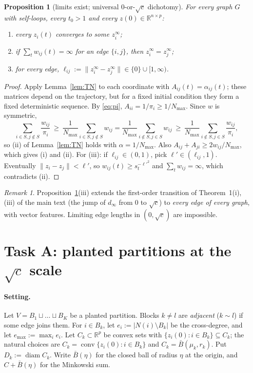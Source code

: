 \documentclass[11pt]{article}
\newtheorem{proposition}[theorem]{Proposition}
\theoremstyle{definition}
\theoremstyle{remark}
\newtheorem{remark}[theorem]{Remark}
\newcommand{\R}{\mathbb{R}}
\newcommand{\diam}{\operatorname{diam}}
\newcommand{\conv}{\operatorname{conv}}
\newcommand{\Nmax}{N_{\max}}
\begin{document}
\begin{proposition}[limits exist; universal $0$-or-$\sqrt c$ dichotomy]\label{prop:dichotomy}
For every graph $G$ with self-loops, every $t_0>1$ and every $z(0)\in\R^{n\times p}$:
\begin{enumerate}[label=(\roman*)]
\item every $z_i(t)$ converges to some $z_i^\infty$;
\item if $\sum_tw_{ij}(t)=\infty$ for an edge $\{i,j\}$, then $z_i^\infty=z_j^\infty$;
\item for every edge, $\ell_{ij}:=\|z_i^\infty-z_j^\infty\|\in\{0\}\cup[1,\infty)$.
\end{enumerate}
\end{proposition}
\begin{proof}
Apply Lemma~\ref{lem:TN} to each coordinate with $A_{ij}(t)=\alpha_{ij}(t)$; these matrices depend on the
trajectory, but for a fixed initial condition they form a fixed deterministic sequence.
By \eqref{eq:pi}, $A_{ii}=1/\pi_i\ge1/\Nmax$. Since $w$ is symmetric,
\[
\sum_{i\in S,j\notin S}\frac{w_{ij}}{\pi_i}\ \ge\ \frac1{\Nmax}\sum_{i\in S,j\notin S}w_{ij}
=\frac1{\Nmax}\sum_{i\notin S,j\in S}w_{ij}\ \ge\ \frac1{\Nmax}\sum_{i\notin S,j\in S}\frac{w_{ij}}{\pi_i},
\]
so (ii) of Lemma~\ref{lem:TN} holds with $\alpha=1/\Nmax$. Also $A_{ij}+A_{ji}\ge 2w_{ij}/\Nmax$, which gives (i) and (ii).
For (iii): if $\ell_{ij}\in(0,1)$, pick $\ell'\in(\ell_{ij},1)$. Eventually $\|z_i-z_j\|<\ell'$, so
$w_{ij}(t)\ge s_t^{-\ell'^2}$ and $\sum_tw_{ij}=\infty$, which contradicts (ii).
\end{proof}

\begin{remark}
Proposition~\ref{prop:dichotomy}(iii) extends the first-order transition of Theorem~1(i),(iii) of the
main text (the jump of $d_\infty$ from $0$ to $\sqrt c$) to \emph{every edge of every graph}, with
vector features. Limiting edge lengths in $(0,\sqrt c)$ are impossible.
\end{remark}

\section{Task A: planted partitions at the $\sqrt c$ scale}

\paragraph{Setting.} Let $V=B_1\sqcup\dots\sqcup B_K$ be a planted partition. Blocks $k\ne l$ are
\emph{adjacent} ($k\sim l$) if some edge joins them. For $i\in B_k$, let $e_i:=|N(i)\setminus B_k|$ be the
cross-degree, and let $e_{\max}:=\max_ie_i$. Let $C_k\subset\R^p$ be convex sets with
$\{z_i(0): i\in B_k\}\subseteq C_k$; the natural choices are $C_k=\conv\{z_i(0):i\in B_k\}$ and
$C_k=\bar B(\mu_k,r_k)$. Put $D_k:=\diam C_k$. Write $\bar B(\eta)$ for the closed ball of radius $\eta$ at the
origin, and $C+\bar B(\eta)$ for the Minkowski sum.
\end{document}

